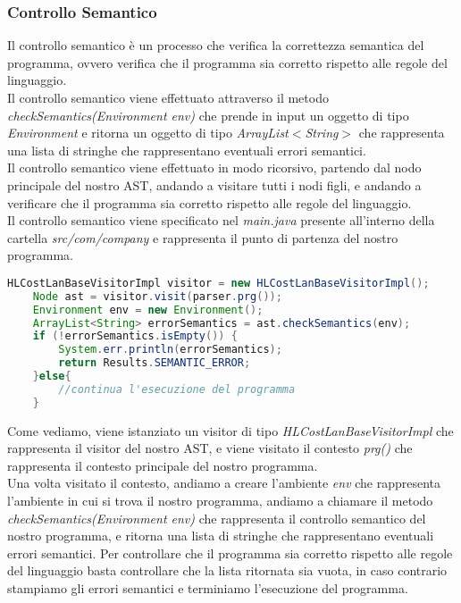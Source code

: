 \documentclass[../../main.tex]{subfiles}
\begin{document}
\subsubsection{Controllo Semantico}
Il controllo semantico è un processo che verifica la correttezza semantica del programma, ovvero verifica che il programma sia corretto rispetto alle regole del linguaggio.\\
Il controllo semantico viene effettuato attraverso il metodo \textit{checkSemantics(Environment env)} che prende in input un oggetto di tipo \textit{Environment} e ritorna un oggetto di tipo \textit{ArrayList$<$String$>$} che rappresenta una lista di stringhe che rappresentano eventuali errori semantici.\\
Il controllo semantico viene effettuato in modo ricorsivo, partendo dal nodo principale del nostro AST, andando a visitare tutti i nodi figli, e andando a verificare che il programma sia corretto rispetto alle regole del linguaggio.\\
Il controllo semantico viene specificato nel \textit{main.java} presente all'interno della cartella \textit{src/com/company} e rappresenta il punto di partenza del nostro programma.
\newpage
\begin{lstlisting}[language=Java, caption={Inizio Controllo semantico }]
    HLCostLanBaseVisitorImpl visitor = new HLCostLanBaseVisitorImpl();
    Node ast = visitor.visit(parser.prg());
    Environment env = new Environment();
    ArrayList<String> errorSemantics = ast.checkSemantics(env);
    if (!errorSemantics.isEmpty()) {
        System.err.println(errorSemantics);
        return Results.SEMANTIC_ERROR;
    }else{
        //continua l'esecuzione del programma
    }
\end{lstlisting}
Come vediamo, viene istanziato un visitor di tipo \textit{HLCostLanBaseVisitorImpl} che rappresenta il visitor del nostro AST, e viene visitato il contesto \textit{prg()} che rappresenta il contesto principale del nostro programma.\\
Una volta visitato il contesto, andiamo a creare l'ambiente \textit{env} che rappresenta l'ambiente in cui si trova il nostro programma, andiamo a chiamare il metodo \textit{checkSemantics(Environment env)} che rappresenta il controllo semantico del nostro programma, e ritorna una lista di stringhe che rappresentano eventuali errori semantici. Per controllare che il programma sia corretto rispetto alle regole del linguaggio basta controllare che la lista ritornata sia vuota, in caso contrario stampiamo gli errori semantici e terminiamo l'esecuzione del programma.\\
\end{document}
